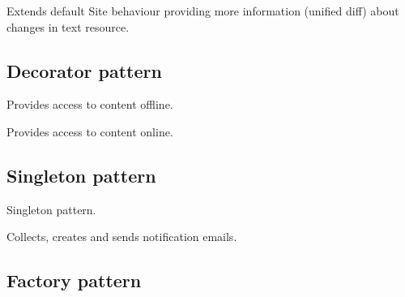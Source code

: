 \documentclass[letterpaper,10pt,english]{sphinxmanual}
\begin{document}

\begin{fulllineitems}
\label{index:spy.TextSite}
Extends default Site behaviour providing more information (unified diff)
about changes in text resource.

\end{fulllineitems}



\subsection{Decorator pattern}
\label{index:decorator-pattern}

\begin{fulllineitems}
\label{index:spy.OfflineSiteDecorator}
Provides access to content offline.

\end{fulllineitems}


\begin{fulllineitems}
\label{index:spy.OnlineSiteDecorator}
Provides access to content online.

\end{fulllineitems}



\subsection{Singleton pattern}
\label{index:singleton-pattern}

\begin{fulllineitems}
\label{index:spy.Mailer}
Singleton pattern.

Collects, creates and sends notification emails.

\end{fulllineitems}



\subsection{Factory pattern}
\label{index:factory-pattern}
\end{document}
